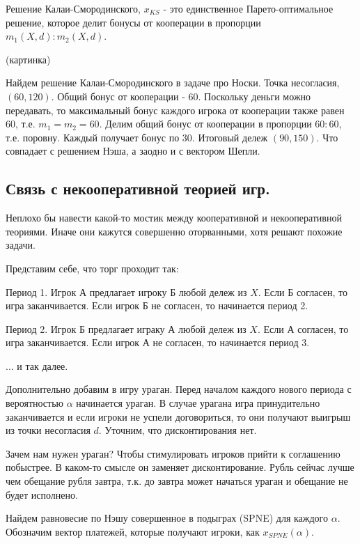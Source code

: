 \begin{theorem}Решение Калаи-Смородинского, $x_{KS}$ - это единственное
Парето-оптимальное решение, которое делит бонусы от кооперации в пропорции
$m_{1}(X,d):m_{2}(X,d)$.\end{theorem}

(картинка)

Найдем решение Калаи-Смородинского в задаче про Носки. Точка несогласия,
$(60,120)$. Общий бонус от кооперации - $60$. Поскольку деньги можно
передавать, то максимальный бонус каждого игрока от кооперации также
равен $60$, т.е. $m_{1}=m_{2}=60$. Делим общий бонус от кооперации
в пропорции $60:60$, т.е. поровну. Каждый получает бонус по $30$.
Итоговый дележ $(90,150).$ Что совпадает с решением Нэша, а заодно
и с вектором Шепли.


\subsection{Связь с некооперативной теорией игр.}

Неплохо бы навести какой-то мостик между кооперативной и некооперативной
теориями. Иначе они кажутся совершенно оторванными, хотя решают похожие
задачи.

Представим себе, что торг проходит так:

Период 1. Игрок А предлагает игроку Б любой дележ из $X$. Если Б
согласен, то игра заканчивается. Если игрок Б не согласен, то начинается
период 2.

Период 2. Игрок Б предлагает играку А любой дележ из $X$. Если А
согласен, то игра заканчивается. Если игрок А не согласен, то начинается
период 3.

... и так далее.

Дополнительно добавим в игру ураган. Перед началом каждого нового
периода с вероятностью $\alpha$ начинается ураган. В случае урагана игра
принудительно заканчивается и если игроки не успели договориться,
то они получают выигрыш из точки несогласия $d$. Уточним, что дисконтирования
нет.

Зачем нам нужен ураган? Чтобы стимулировать игроков прийти к соглашению
побыстрее. В каком-то смысле он заменяет дисконтирование. Рубль сейчас
лучше чем обещание рубля завтра, т.к. до завтра может начаться ураган
и обещание не будет исполнено.

Найдем равновесие по Нэшу совершенное в подыграх (SPNE) для каждого
$\alpha$. Обозначим вектор платежей, которые получают игроки, как $x_{SPNE}(\alpha)$.

